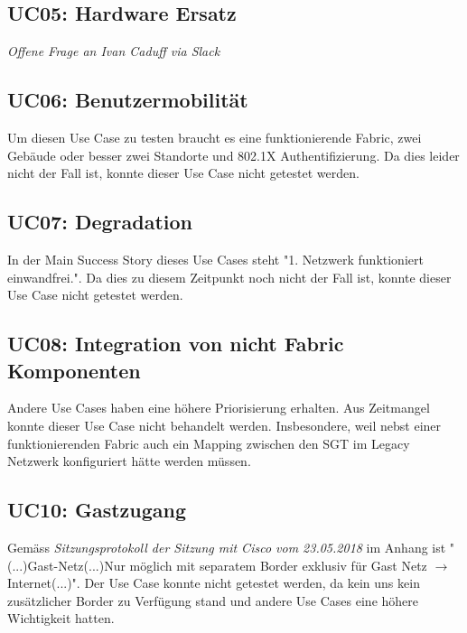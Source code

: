 \begin{landscape}
\pagebreak

\subsection{UC05: Hardware Ersatz}
\textit{Offene Frage an Ivan Caduff via Slack}

\pagebreak

\subsection{UC06: Benutzermobilität}
Um diesen Use Case zu testen braucht es eine funktionierende Fabric, zwei Gebäude oder besser zwei Standorte und 802.1X Authentifizierung. Da dies leider nicht der Fall ist, konnte dieser Use Case nicht getestet werden. 

\pagebreak

\subsection{UC07: Degradation}
In der Main Success Story dieses Use Cases steht "1. Netzwerk funktioniert einwandfrei.". Da dies zu diesem Zeitpunkt noch nicht der Fall ist, konnte dieser Use Case nicht getestet werden. 

\pagebreak

\subsection{UC08: Integration von nicht Fabric Komponenten}
Andere Use Cases haben eine höhere Priorisierung erhalten. Aus Zeitmangel konnte dieser Use Case nicht behandelt werden. Insbesondere, weil nebst einer funktionierenden Fabric auch ein Mapping zwischen den SGT im Legacy Netzwerk konfiguriert hätte werden müssen. 


\subsection{UC10: Gastzugang}
Gemäss \textit{Sitzungsprotokoll der Sitzung mit Cisco vom 23.05.2018} im Anhang ist "(...)Gast-Netz(...)Nur möglich mit separatem Border exklusiv für Gast Netz $\rightarrow$ Internet(...)". Der Use Case konnte nicht getestet werden, da kein uns kein zusätzlicher Border zu Verfügung stand und andere Use Cases eine höhere Wichtigkeit hatten. 


\pagebreak


\end{landscape}
